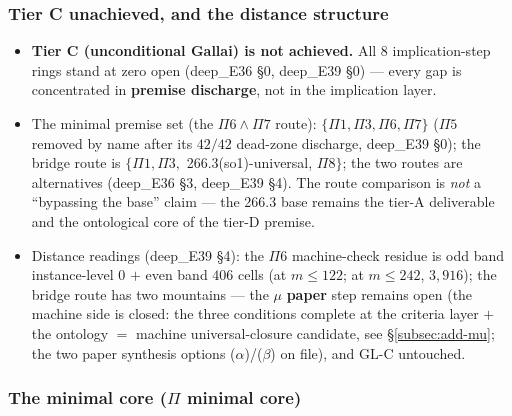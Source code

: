 \subsubsection{Tier C unachieved, and the distance structure
\tierProf}\label{subsubsec:add-tierc}

\begin{itemize}
\item \textbf{Tier C (unconditional Gallai) is not achieved.} All $8$
implication-step rings stand at zero open (deep\_E36 \S0, deep\_E39 \S0) ---
every gap is concentrated in \textbf{premise discharge}, not in the
implication layer.
\item The minimal premise set (the $\Pi6\wedge\Pi7$ route):
\textbf{$\{\Pi1,\Pi3,\Pi6,\Pi7\}$} ($\Pi5$ removed by name after its
$42/42$ dead-zone discharge, deep\_E39 \S0); the bridge route is
$\{\Pi1,\Pi3,$ 266.3(so1)-universal, $\Pi8\}$; the two routes are
alternatives (deep\_E36 \S3, deep\_E39 \S4). The route comparison is
\emph{not} a ``bypassing the base'' claim --- the 266.3 base remains the
tier-A deliverable and the ontological core of the tier-D premise.
\item Distance readings (deep\_E39 \S4): the $\Pi6$ machine-check residue is
odd band instance-level $0$ $+$ even band $406$ cells (at $m\le122$; at
$m\le242$, $3{,}916$); the bridge route has two mountains --- the $\mu$
\textbf{paper} step remains open (the machine side is closed: the three
conditions complete at the criteria layer $+$ the ontology $=$ machine
universal-closure candidate, see \S\ref{subsec:add-mu}; the two paper
synthesis options ($\alpha$)/($\beta$) on file), and GL-C untouched.
\end{itemize}

\subsubsection{The minimal core ($\Pi$ minimal core)}\label{subsubsec:add-mincore}

